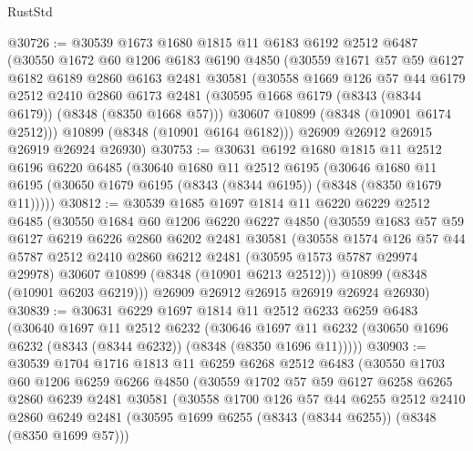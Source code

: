 \begin{lexlean}{RustStd}
\begin{coremodule}
@30726 := @30539
    @1673
    @1680
    @1815
    @11
    @6183
    @6192
    @2512
    @6487
    (@30550
      @1672
      @60
      @1206
      @6183
      @6190
      @4850
      (@30559
        @1671
        @57
        @59
        @6127
        @6182
        @6189
        @2860
        @6163
        @2481
        @30581
        (@30558
          @1669
          @126
          @57
          @44
          @6179
          @2512
          @2410
          @2860
          @6173
          @2481
          (@30595 @1668 @6179 (@8343 (@8344 @6179)) (@8348 (@8350 @1668 @57)))
          @30607
          @10899
          (@8348 (@10901 @6174 @2512)))
        @10899
        (@8348 (@10901 @6164 @6182)))
      @26909
      @26912
      @26915
      @26919
      @26924
      @26930)
@30753 := @30631
    @6192
    @1680
    @1815
    @11
    @2512
    @6196
    @6220
    @6485
    (@30640
      @1680
      @11
      @2512
      @6195
      (@30646 @1680 @11 @6195 (@30650 @1679 @6195 (@8343 (@8344 @6195)) (@8348 (@8350 @1679 @11)))))
@30812 := @30539
    @1685
    @1697
    @1814
    @11
    @6220
    @6229
    @2512
    @6485
    (@30550
      @1684
      @60
      @1206
      @6220
      @6227
      @4850
      (@30559
        @1683
        @57
        @59
        @6127
        @6219
        @6226
        @2860
        @6202
        @2481
        @30581
        (@30558
          @1574
          @126
          @57
          @44
          @5787
          @2512
          @2410
          @2860
          @6212
          @2481
          (@30595 @1573 @5787 @29974 @29978)
          @30607
          @10899
          (@8348 (@10901 @6213 @2512)))
        @10899
        (@8348 (@10901 @6203 @6219)))
      @26909
      @26912
      @26915
      @26919
      @26924
      @26930)
@30839 := @30631
    @6229
    @1697
    @1814
    @11
    @2512
    @6233
    @6259
    @6483
    (@30640
      @1697
      @11
      @2512
      @6232
      (@30646 @1697 @11 @6232 (@30650 @1696 @6232 (@8343 (@8344 @6232)) (@8348 (@8350 @1696 @11)))))
@30903 := @30539
    @1704
    @1716
    @1813
    @11
    @6259
    @6268
    @2512
    @6483
    (@30550
      @1703
      @60
      @1206
      @6259
      @6266
      @4850
      (@30559
        @1702
        @57
        @59
        @6127
        @6258
        @6265
        @2860
        @6239
        @2481
        @30581
        (@30558
          @1700
          @126
          @57
          @44
          @6255
          @2512
          @2410
          @2860
          @6249
          @2481
          (@30595 @1699 @6255 (@8343 (@8344 @6255)) (@8348 (@8350 @1699 @57)))

\end{coremodule}
\end{lexlean}

